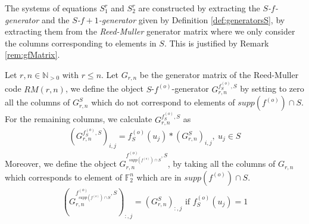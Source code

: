 \documentclass[11pt]{llncs}
\begin{document}
The systems of equations $S_1^r$ and $S_2^r$ are constructed by extracting the \textit{$S$-$f$-generator} and the \textit{$S$-$f+1$-generator} given by Definition \ref{def:generatorsS}, by extracting them from the \textit{Reed-Muller} generator matrix where we only consider the columns corresponding to elements in $S$. This is justified by Remark \ref{rem:gfMatrix}.





\begin{definition}\label{def:generatorsS}
Let $r,n\in\mathbb{N}_{>0}$ with $r\leq n$. Let $G_{r,n}$ be the generator matrix of the Reed-Muller code $RM(r,n)$, we define the object $S$-$f^{(o)}$-generator $G_{r,n}^{f^{(o)}_S,S}$ by setting to zero all the columns of $G_{r,n}^S$ which do not correspond to elements of $supp(f^{(o)} )\cap S$. For the remaining columns, we calculate $G_{r,n}^{f_S^{(o)},S}$ as
	\begin{align*}
	\left(G_{r,n}^{f^{(o)}_S,S}\right)_{i,j} = f_S^{(o)}(u_j)*\left(G_{r,n}^S\right)_{i,j}, \ u_j \in S
	\end{align*}
	Moreover, we define the object $G_{r,n}^{f^{(o)}_{supp\left(f^{(o)}\right) \cap S},S}$, by taking all the columns of $G_{r,n}$ which corresponds to element of $\mathbb{F}_2^n$ which are in $supp\left(f^{(o)}\right) \cap S$.
	\begin{align}
	\left(G_{r,n}^{f_{supp\left(f^{(o)}\right) \cap S}^{(o)},S}\right)_{:,j} = (G_{r,n}^S)_{:,j} \mbox{ if } f_S^{(o)}(u_j) = 1 \label{eq:f-generatorRestrictedSet}
	\end{align}
\end{definition}


\end{document}
